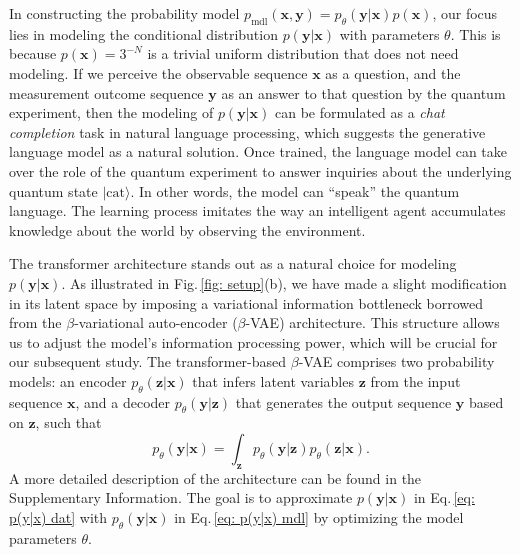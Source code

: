 \documentclass[fleqn,11pt]{wlscirep}
\newcommand{\ket}[1]{|#1 \rangle}
\newcommand{\vect}[1]{{\bm{#1}}}
\newcommand{\eq}[1]{\begin{equation}#1\end{equation}}
\newcommand{\eqnref}[1]{Eq.\,\eqref{#1}}
\newcommand{\figref}[1]{Fig.\,\ref{#1}}
\begin{document}
In constructing the probability model $p_\text{mdl}(\vect{x},\vect{y})=p_\theta(\vect{y}|\vect{x})p(\vect{x})$, our focus lies in modeling the conditional distribution $p(\vect{y}|\vect{x})$ with parameters $\theta$. This is because $p(\vect{x})=3^{-N}$ is a trivial uniform distribution that does not need modeling. If we perceive the observable sequence $\vect{x}$ as a question, and the measurement outcome sequence $\vect{y}$ as an answer to that question by the quantum experiment, then the modeling of $p(\vect{y}|\vect{x})$ can be formulated as a \emph{chat completion} task in natural language processing, which suggests the generative language model as a natural solution. Once trained, the language model can take over the role of the quantum experiment to answer inquiries about the underlying quantum state $\ket{\text{cat}}$. In other words, the model can ``speak'' the quantum language. The learning process imitates the way an intelligent agent accumulates knowledge about the world by observing the environment.

The transformer\cite{Vaswani2017A1706.03762} architecture stands out as a natural choice for modeling $p(\vect{y}|\vect{x})$. As illustrated in \figref{fig: setup}(b), we have made a slight modification in its latent space by imposing a variational information bottleneck \cite{Tishby2000Tphysics/0004057, Tishby2015D1503.02406} borrowed from the $\beta$-variational auto-encoder ($\beta$-VAE)\cite{Higgins2017b} architecture. This structure allows us to adjust the model's information processing power, which will be crucial for our subsequent study. The transformer-based $\beta$-VAE  comprises two probability models: an encoder $p_\theta(\vect{z}|\vect{x})$ that infers latent variables $\vect{z}$ from the input sequence $\vect{x}$, and a decoder $p_\theta(\vect{y}|\vect{z})$ that generates the output sequence $\vect{y}$ based on $\vect{z}$, such that
\eq{\label{eq: p(y|x) mdl}
p_\theta(\vect{y}|\vect{x})=\int_\vect{z} p_\theta(\vect{y}|\vect{z})p_\theta(\vect{z}|\vect{x}).} A more detailed description of the architecture can be found in the Supplementary Information. The goal is to approximate $p(\vect{y}|\vect{x})$ in \eqnref{eq: p(y|x) dat} with $p_\theta(\vect{y}|\vect{x})$ in \eqnref{eq: p(y|x) mdl} by optimizing the model parameters $\theta$.
\end{document}
